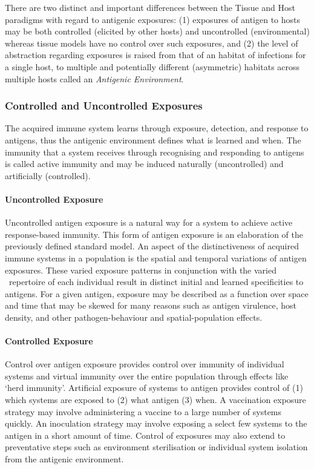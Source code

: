 There are two distinct and important differences between the Tissue and Host paradigms with regard to antigenic exposures: (1) exposures of antigen to hosts may be both controlled (elicited by other hosts) and uncontrolled (environmental) whereas tissue models have no control over such exposures, and (2) the level of abstraction regarding exposures is raised from that of an habitat of infections for a single host, to multiple and potentially different (asymmetric) habitats across multiple hosts called an \emph{Antigenic Environment}. 

%
%
\subsubsection{Controlled and Uncontrolled Exposures}
\label{sec:hosts:paradigm:exposures:control}
The acquired immune system learns through exposure, detection, and response to antigens, thus the antigenic environment defines what is learned and when. The immunity that a system receives through recognising and responding to antigens is called active immunity and may be induced naturally (uncontrolled) and artificially (controlled). 

\paragraph{Uncontrolled Exposure}
Uncontrolled antigen exposure is a natural way for a system to achieve active response-based immunity. This form of antigen exposure is an elaboration of the previously defined standard model. An aspect of the distinctiveness of acquired immune systems in a population is the spatial and temporal variations of antigen exposures. These varied exposure patterns in conjunction with the varied \naive\ repertoire of each individual result in distinct initial and learned specificities to antigens. For a given antigen, exposure may be described as a function over space and time that may be skewed for many reasons such as antigen virulence, host density, and other pathogen-behaviour and spatial-population effects.

\paragraph{Controlled Exposure}
Control over antigen exposure provides control over immunity of individual systems and virtual immunity over the entire population through effects like `herd immunity'. Artificial exposure of systems to antigen provides control of (1) which systems are exposed to (2) what antigen (3) when. A vaccination exposure strategy may involve administering a vaccine to a large number of systems quickly. An inoculation strategy may involve exposing a select few systems to the antigen in a short amount of time. Control of exposures may also extend to preventative steps such as environment sterilisation or individual system isolation from the antigenic environment.



